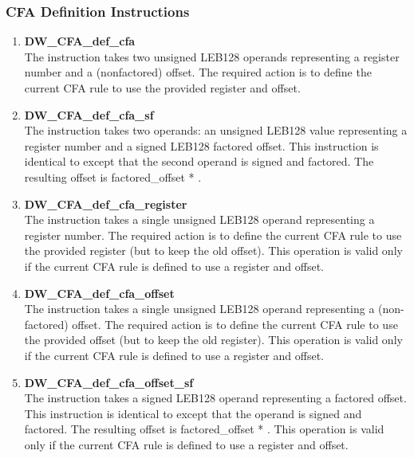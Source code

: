 \subsubsection{CFA Definition Instructions}
\label{chap:cfadefinitioninstructions}

\begin{enumerate}[1.]
\item \textbf{DW\-\_CFA\-\_def\-\_cfa} \\
The  instruction takes two unsigned LEB128
operands representing a register number and a (non\dash factored)
offset. The required action is to define the current CFA rule
to use the provided register and offset.

\item \textbf{ DW\-\_CFA\-\_def\-\_cfa\-\_sf} \\
The  instruction takes two operands:
an unsigned LEB128 value representing a register number and a
signed LEB128 factored offset. This instruction is identical
to  except that the second operand is signed
and factored. The resulting offset is factored\_offset *
.


\item \textbf{DW\-\_CFA\-\_def\-\_cfa\-\_register} \\
The  instruction takes a single
unsigned LEB128 operand representing a register number. The
required action is to define the current CFA rule to use
the provided register (but to keep the old offset). This
operation is valid only if the current CFA rule is defined
to use a register and offset.



\item \textbf{DW\-\_CFA\-\_def\-\_cfa\-\_offset} \\
The  instruction takes a single
unsigned LEB128 operand representing a (non-factored)
offset. The required action is to define the current CFA rule
to use the provided offset (but to keep the old register). This
operation is valid only if the current CFA rule is defined
to use a register and offset.


\item \textbf{DW\-\_CFA\-\_def\-\_cfa\-\_offset\-\_sf} \\
The  instruction takes a signed
LEB128 operand representing a factored offset. This instruction
is identical to  except that the
operand is signed and factored. The resulting offset is
factored\_offset * .
This operation
is valid only if the current CFA rule is defined to use a
register and offset.


\end{enumerate}
